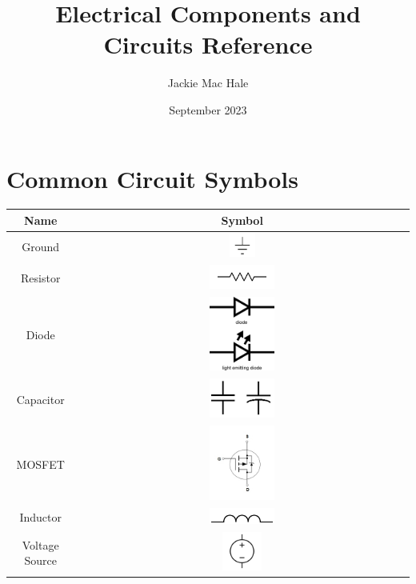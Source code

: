 \documentclass{article}
\title{Electrical Components and Circuits Reference}
\author{Jackie Mac Hale}
\date{September 2023}
\begin{document}
\maketitle

\tableofcontents

\section{Common Circuit Symbols}

\begin{tabular}{c|c}
    Name & Symbol \\
    \hline
    Ground & \includegraphics[width=0.08\textwidth]{img/Symbol G7_Earth.JPG}\\
    \hline
    Resistor & 
    \includegraphics[width=0.2\textwidth]{img/1280px-Resistor_symbol_America.svg.png}\\
    \hline
    Diode & \includegraphics[width=0.2\textwidth]{img/51f1c87ace395fea20000004.png}\\
    \hline
    Capacitor & \includegraphics[width=0.2\textwidth]{img/Screenshot_20200913_143337.png} \\
    \hline
    MOSFET & \includegraphics[width=0.2\textwidth]{img/62fe4e5439abf066e1badb3f8a73b483b52614ec.jpeg} \\
    \hline
    Inductor & \includegraphics[width=0.2\textwidth]{img/1280px-Inductor_symbol.svg.png}\\
    \hline
    Voltage Source & \includegraphics[width=0.12\textwidth]{img/1200px-Voltage_Source.svg.png}
\end{tabular}
\end{document}
